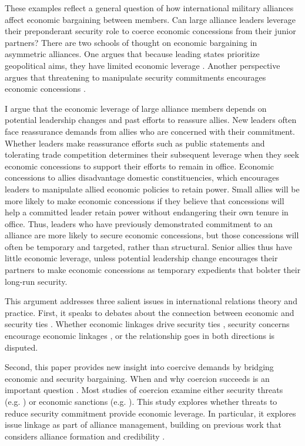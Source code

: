 \documentclass[12pt]{article}
\begin{document}
These examples reflect a general question of how international military alliances affect economic bargaining between members. 
Can large alliance leaders leverage their preponderant security role to coerce economic concessions from their junior partners? 
There are two schools of thought on economic bargaining in asymmetric alliances. 
One argues that because leading states prioritize geopolitical aims, they have limited economic leverage \citep{Drezner2013, WolfordKim2017}.
Another perspective argues that threatening to manipulate security commitments encourages economic concessions \citep[pg. 122]{Oatley2015}. 


I argue that the economic leverage of large alliance members depends on potential leadership changes and past efforts to reassure allies.
New leaders often face reassurance demands from allies who are concerned with their commitment. 
Whether leaders make reassurance efforts such as public statements and tolerating trade competition determines their subsequent leverage when they seek economic concessions to support their efforts to remain in office. 
Economic concessions to allies disadvantage domestic constituencies, which encourages leaders to manipulate allied economic policies to retain power.
Small allies will be more likely to make economic concessions if they believe that concessions will help a committed leader retain power without endangering their own tenure in office.  
Thus, leaders who have previously demonstrated commitment to an alliance are more likely to secure economic concessions, but those concessions will often be temporary and targeted, rather than structural.
Senior allies thus have little economic leverage, unless potential leadership change encourages their partners to make economic concessions as temporary expedients that bolster their long-run security. 


This argument addresses three salient issues in international relations theory and practice. 
First, it speaks to debates about the connection between economic and security ties \citep{Mastanduno2009, Poast2019}. 
Whether economic linkages drive security ties \citep{BiglaiserDeRouen2007, Fordham2010, Kimball2010}, security concerns encourage economic linkages \citep{Gowa1995, Li2003, LongLeeds2006, GowaMansfield2004}, or the relationship goes in both directions \citep{BiglaiserDeRouen2009, KinneBunte2018} is disputed. 


Second, this paper provides new insight into coercive demands by bridging economic and security bargaining.
When and why coercion succeeds is an important question \citep{Sechser2010, Sechser2018, Cebuletal2021}.  
Most studies of coercion examine either security threats (e.g. \citep{HorowitzReiter2001, Sechser2011}) or economic sanctions (e.g. \citep{Marinov2005, Allen2008, Escriba-FolchWright2010}).
This study explores whether threats to reduce security commitment provide economic leverage. 
In particular, it explores issue linkage as part of alliance management, building on previous work that considers alliance formation \citep{Poast2012} and credibility \citep{Davis2008, Poast2013}. 
\end{document}
